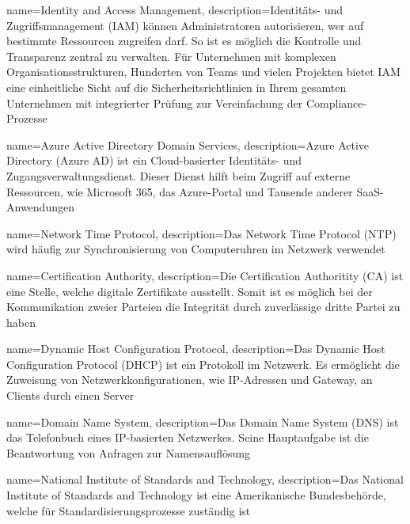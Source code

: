 


{
    name=Identity and Access Management,
    description={Identitäts- und Zugriffsmanagement (IAM) können Administratoren autorisieren, wer auf bestimmte Ressourcen zugreifen darf. So ist es möglich die Kontrolle und Transparenz zentral zu verwalten. Für Unternehmen mit komplexen Organisationsstrukturen, Hunderten von Teams und vielen Projekten bietet IAM eine einheitliche Sicht auf die Sicherheitsrichtlinien in Ihrem gesamten Unternehmen mit integrierter Prüfung zur Vereinfachung der Compliance-Prozesse}
}

{
    name=Azure Active Directory Domain Services,
    description={Azure Active Directory (Azure AD) ist ein Cloud-basierter Identitäts- und Zugangsverwaltungsdienst. Dieser Dienst hilft beim Zugriff auf externe Ressourcen, wie Microsoft 365, das Azure-Portal und Tausende anderer SaaS-Anwendungen}
}

{
    name=Network Time Protocol,
    description={Das Network Time Protocol (NTP) wird häufig zur Synchronisierung von Computeruhren im Netzwerk verwendet}
}

{
    name=Certification Authority,
    description={Die Certification Authoritity (CA) ist eine Stelle, welche digitale Zertifikate ausstellt. Somit ist es möglich bei der Kommunikation zweier Parteien die Integrität durch zuverlässige dritte Partei zu haben}
}

{
    name=Dynamic Host Configuration Protocol,
    description={Das Dynamic Host Configuration Protocol (DHCP) ist ein Protokoll im Netzwerk. Es ermöglicht die Zuweisung von Netzwerkkonfigurationen, wie IP-Adressen und Gateway, an Clients durch einen Server}
}

{
    name=Domain Name System,
    description={Das Domain Name System (DNS) ist das Telefonbuch eines IP-basierten Netzwerkes. Seine Hauptaufgabe ist die Beantwortung von Anfragen zur Namensauflösung}
}

{
    name=National Institute of Standards and Technology,
    description={Das National Institute of Standards and Technology ist eine Amerikanische Bundesbehörde, welche für Standardisierungsprozesse zuständig ist}
}

